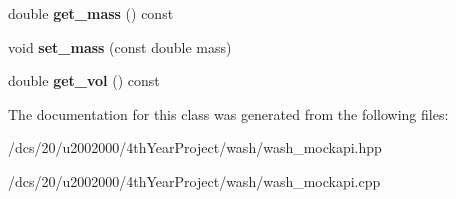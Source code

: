 \begin{DoxyCompactItemize}
\mbox{\label{classwash_1_1Particle_a7d8d11b3e4855e66e62ee58b4270cdc1}} 
double {\bfseries get\+\_\+mass} () const
\item 
\mbox{\label{classwash_1_1Particle_a9151ed34c880f63f062381076834223e}} 
void {\bfseries set\+\_\+mass} (const double mass)
\item 
\mbox{\label{classwash_1_1Particle_ab16021a2c003de07dc0a418ffc3d5eb7}} 
double {\bfseries get\+\_\+vol} () const
\end{DoxyCompactItemize}


The documentation for this class was generated from the following files\+:\begin{DoxyCompactItemize}
\item 
/dcs/20/u2002000/4th\+Year\+Project/wash/wash\+\_\+mockapi.\+hpp\item 
/dcs/20/u2002000/4th\+Year\+Project/wash/wash\+\_\+mockapi.\+cpp\end{DoxyCompactItemize}
